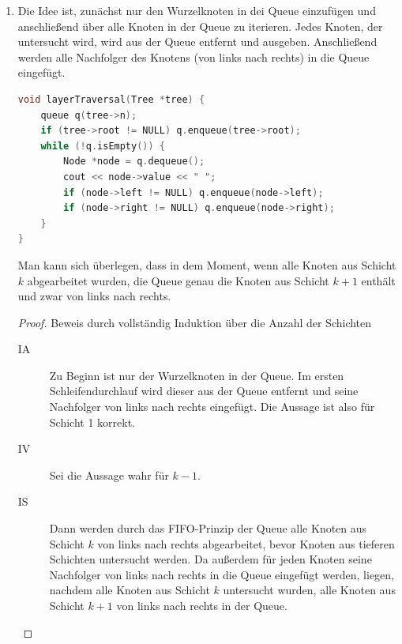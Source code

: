 \documentclass[11pt,a4paper]{article}
\begin{document}
\begin{loesung}
\begin{enumerate}
        \item Die Idee ist, zunächst nur den Wurzelknoten in dei Queue einzufügen und anschließend über alle Knoten in der Queue zu iterieren.
        Jedes Knoten, der untersucht wird, wird aus der Queue entfernt und ausgeben.
        Anschließend werden alle Nachfolger des Knotens (von links nach rechts) in die Queue eingefügt.
        \begin{lstlisting}[language=c++]
void layerTraversal(Tree *tree) {
    queue q(tree->n);
    if (tree->root != NULL) q.enqueue(tree->root);
    while (!q.isEmpty()) {
        Node *node = q.dequeue();
        cout << node->value << " ";
        if (node->left != NULL) q.enqueue(node->left);
        if (node->right != NULL) q.enqueue(node->right);
    }
}            
        \end{lstlisting}
        Man kann sich überlegen, dass in dem Moment, wenn alle Knoten aus Schicht $k$ abgearbeitet wurden, die Queue genau die Knoten aus Schicht $k + 1$ enthält und zwar von links nach rechts.
        \begin{proof}
            Beweis durch vollständig Induktion über die Anzahl der Schichten
            \begin{description}
                \item[IA] Zu Beginn ist nur der Wurzelknoten in der Queue.
                Im ersten Schleifendurchlauf wird dieser aus der Queue entfernt und seine Nachfolger von links nach rechts eingefügt.
                Die Aussage ist also für Schicht 1 korrekt. 
                \item[IV] Sei die Aussage wahr für $k - 1$.
                \item[IS]
                Dann werden durch das FIFO-Prinzip der Queue alle Knoten aus Schicht $k$ von links nach rechts abgearbeitet, bevor Knoten aus tieferen Schichten untersucht werden.
                Da außerdem für jeden Knoten seine Nachfolger von links nach rechts in die Queue eingefügt werden, liegen, nachdem alle Knoten aus Schicht $k$ untersucht wurden, alle Knoten aus Schicht $k + 1$ von links nach rechts in der Queue.

\end{description}
\end{proof}
\end{enumerate}
\end{loesung}
\end{document}
